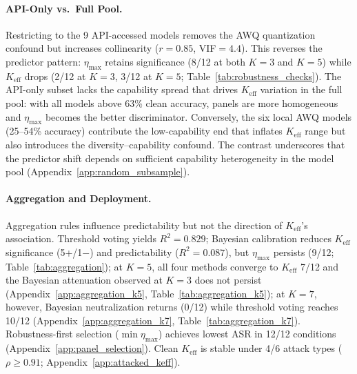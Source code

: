 \paragraph{API-Only vs.\ Full Pool.}
Restricting to the 9 API-accessed models removes the AWQ quantization confound but increases collinearity ($r{=}0.85$, VIF${=}4.4$). This reverses the predictor pattern: $\eta_{\max}$ retains significance (8/12 at both $K{=}3$ and $K{=}5$) while $K_{\mathrm{eff}}$ drops (2/12 at $K{=}3$, 3/12 at $K{=}5$; Table~\ref{tab:robustness_checks}). The API-only subset lacks the capability spread that drives $K_{\mathrm{eff}}$ variation in the full pool: with all models above 63\% clean accuracy, panels are more homogeneous and $\eta_{\max}$ becomes the better discriminator. Conversely, the six local AWQ models (25--54\% accuracy) contribute the low-capability end that inflates $K_{\mathrm{eff}}$ range but also introduces the diversity--capability confound. The contrast underscores that the predictor shift depends on sufficient capability heterogeneity in the model pool (Appendix~\ref{app:random_subsample}).

\paragraph{Aggregation and Deployment.}
Aggregation rules influence predictability but not the direction of $K_{\mathrm{eff}}$'s association. Threshold voting yields $R^2{=}0.829$; Bayesian calibration reduces $K_{\mathrm{eff}}$ significance (5+/1$-$) and predictability ($R^2{=}0.087$), but $\eta_{\max}$ persists (9/12; Table~\ref{tab:aggregation}); at $K{=}5$, all four methods converge to $K_{\mathrm{eff}}$ 7/12 and the Bayesian attenuation observed at $K{=}3$ does not persist (Appendix~\ref{app:aggregation_k5}, Table~\ref{tab:aggregation_k5}); at $K{=}7$, however, Bayesian neutralization returns (0/12) while threshold voting reaches 10/12 (Appendix~\ref{app:aggregation_k7}, Table~\ref{tab:aggregation_k7}). Robustness-first selection ($\min \eta_{\max}$) achieves lowest ASR in 12/12 conditions (Appendix~\ref{app:panel_selection}). Clean $K_{\mathrm{eff}}$ is stable under 4/6 attack types ($\rho{\geq}0.91$; Appendix~\ref{app:attacked_keff}).

